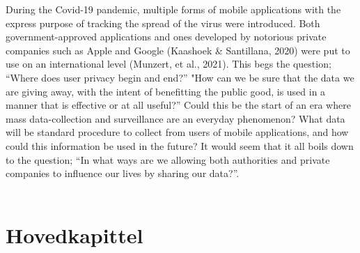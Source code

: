 \documentclass[11pt]{article}
\begin{document}
During the Covid-19 pandemic, multiple forms of mobile applications with the express purpose of tracking the spread of the virus were introduced. Both government-approved applications and ones developed by notorious private companies such as Apple and Google (Kaashoek \& Santillana, 2020) were put to use on an international level (Munzert, et al., 2021). This begs the question; “Where does user privacy begin and end?” "How can we be sure that the data we are giving away, with the intent of benefitting the public good, is used in a manner that is effective or at all useful?” Could this be the start of an era where mass data-collection and surveillance are an everyday phenomenon? What data will be standard procedure to collect from users of mobile applications, and how could this information be used in the future? It would seem that it all boils down to the question; “In what ways are we allowing both authorities and private companies to influence our lives by sharing our data?”. 
\\ \\
\section{Hovedkapittel}
\end{document}
